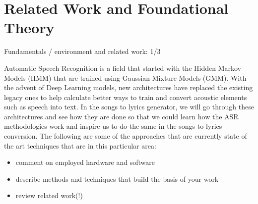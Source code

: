 
\chapter{Related Work and Foundational Theory}%
\label{sec:fundamentals}

Fundamentals / environment and related work: 1/3


Automatic Speech Recognition is a field that started with the Hidden Markov Models (HMM) that are trained using Gaussian Mixture Models (GMM). With the advent of Deep Learning models, new architectures have replaced the existing legacy ones to help calculate better ways to train and convert acoustic elements such as speech into text. In the songs to lyrics generator, we will go through these architectures and see how they are done so that we could learn how the ASR methodologies work and inspire us to do the same in the songs to lyrics conversion. The following are some of the approaches that are currently state of the art techniques that are in this particular area:

\begin{itemize}
    \item comment on employed hardware and software
    \item describe methods and techniques that build the basis of your work
    \item review related work(!)

    
\end{itemize}
